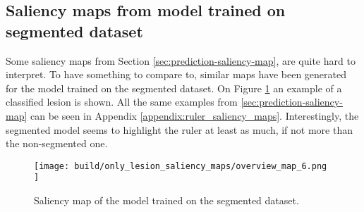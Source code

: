 \subsection{Saliency maps from model trained on segmented dataset}
Some saliency maps from Section \ref{sec:prediction-saliency-map},
are quite hard to interpret.
To have something to compare to, similar maps have been generated for the model
trained on the segmented dataset.
On Figure \ref{fig:segmented_prediction_saliency_map} an example of a classified lesion is shown.
All the same examples from \ref{sec:prediction-saliency-map} can be seen in Appendix \ref{appendix:ruler_saliency_maps}.
Interestingly, the segmented model seems to highlight the ruler at least as much, if not more than the non-segmented one.
\begin{figure}[ht]
    \centering
    \texttt{[image: 
        build/only\_lesion\_saliency\_maps/overview\_map\_6.png
    ]}
    \caption{Saliency map of the model trained on the segmented dataset.}
    \label{fig:segmented_prediction_saliency_map}
\end{figure}
